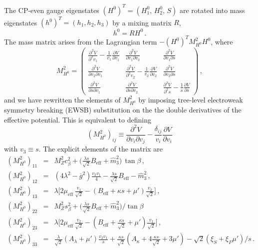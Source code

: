\documentclass[final,3p,times,pdflatex]{elsarticle}
\newcommand{\be}{\begin{equation}}
\newcommand{\ee}{\end{equation}}
\newcommand{\ba}{\begin{eqnarray}}
\newcommand{\ea}{\end{eqnarray}}
\newcommand{\ds}{\displaystyle}
\begin{document}
The CP-even gauge eigenstates $(H^0)^T = (H_1^0,\, H_2^0, \, S)$ are rotated into
 mass eigenstates $(h^0)^T = (h_1, h_2, h_3)$ by a mixing matrix $R$,
%
\be 
h^0 = R H^0\,. 
\ee 
%
The mass matrix arises from the Lagrangian term $-(H^0)^T M^2_{H^0} H^0$, where
\be
M_{H^0}^2=
\left(
\begin{array}{ccc}
\ds\frac{\partial^2 V}{\partial^2 v_1 } 
- \ds\frac{1}{v_1}\frac{\partial V}{\partial v_1}&
\ds\frac{\partial^2 V}{\partial v_1 \partial v_2}&
\ds\frac{\partial^2 V}{\partial v_1 \partial s}\\[0.3cm]
\ds\frac{\partial^2 V}{\partial v_2 \partial v_1}&
\ds\frac{\partial^2 V}{\partial^2 v_2} 
- \ds\frac{1}{v_2}\frac{\partial V}{\partial v_2}&
\ds\frac{\partial^2 V}{\partial v_2 \partial s}\\[0.3cm]
\ds\frac{\partial^2 V}{\partial s \partial v_1}&
\ds\frac{\partial^2 V}{\partial s \partial v_2}&
\ds\frac{\partial^2 V}{\partial^2 s} 
- \ds\frac{1}{s}\frac{\partial V}{\partial s}
\end{array} 
\right) \,,
 \ee 
and we have rewritten the elements of $M_{H^0}^2$ by imposing tree-level 
electroweak symmetry breaking (EWSB) substitution on the the double derivatives 
of the effective potential.  This is equivalent to defining  
%
\be
(M_{H^0}^2)_{ij} \equiv  \ds\frac{\partial^2 V}{\partial v_i \partial v_j} 
- \ds\frac{\delta_{ij}}{v_i}\ds\frac{\partial V}{\partial v_i}
\ee
%
with $v_3 \equiv s$.  The explicit elements of the matrix are  
%
\ba
 (M_{H^0}^2)_{11} & = & M_Z^2 c_\beta^2 
 + \Bigg(\ds\frac{\lambda s}{\sqrt{2}} B_\textrm{eff} +
 \widehat{m}_3^2\Bigg)\,\tan\beta\,,\\
 (M_{H^0}^2)_{12} & = & (4\lambda^2 - \overline{g}^2) \ds\frac{v_2 v_1 }{4}- 
 \ds\frac{\lambda s}{\sqrt{2}} B_\textrm{eff} - \widehat{m}_3^2\,, \\ 
 (M_{H^0}^2)_{13} & = & \lambda \Bigg[2 \mu_\textrm{eff}\,\ds\frac{ v_1}{\sqrt{2}} -
 (B_\textrm{eff} + \kappa s + \mu')\ds\frac{ v_2}{\sqrt{2}}\Bigg]\,,\\
 (M_{H^0}^2)_{22} & = & M_Z^2 s_\beta^2 + \Bigg(\ds\frac{\lambda s}{\sqrt{2}} B_\textrm{eff} +
\widehat{m}_3^2\Bigg)/\tan\beta\, \\
 (M_{H^0}^2)_{23} & = & \lambda \Bigg[2 \mu_\textrm{eff}\, \ds\frac{ v_2}{\sqrt{2}} -
(B_\textrm{eff} + \frac{\kappa s}{\sqrt{2}} + \mu')\ds\frac{ v_1}{\sqrt{2}}\Bigg]\,, \\
 (M_{H^0}^2)_{33} & = & \ds\frac{\lambda}{\sqrt{2}} (A_\lambda + \mu') \frac{v_2 v_1}{s}
+ \frac{\kappa s}{\sqrt{2}} (A_\kappa + 4\frac{\kappa s}{\sqrt{2}}+ 3 \mu') - \sqrt{2}(\xi_S + \xi_F \mu')/s\,.
\label{eq:MH0}
\ea
\end{document}
